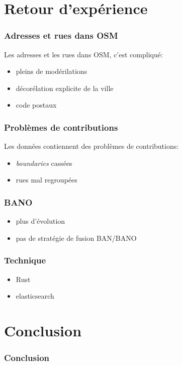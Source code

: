 \documentclass[table]{beamer}
\newcommand*{\foreign}[2][english]{%
    \emph{\foreignlanguage{#1}{#2}}%
}
\begin{document}
\section{Retour d'expérience}

\begin{frame}
  \frametitle{Adresses et rues dans OSM}

  Les adresses et les rues dans OSM, c'est compliqué:
  \begin{itemize}
  \item pleins de modérilations
  \item décorélation explicite de la ville
  \item code postaux
  \end{itemize}
\end{frame}

\begin{frame}
  \frametitle{Problèmes de contributions}

  Les données contiennent des problèmes de contributions:
  \begin{itemize}
  \item \foreign{boundaries} cassées
  \item rues mal regroupées
  \end{itemize}
\end{frame}

\begin{frame}
  \frametitle{BANO}

  \begin{itemize}
  \item plus d'évolution
  \item pas de stratégie de fusion BAN/BANO
  \end{itemize}
\end{frame}

\begin{frame}
  \frametitle{Technique}

  \begin{itemize}
  \item Rust
  \item elasticsearch
  \end{itemize}
\end{frame}

\section{Conclusion}

\begin{frame}
  \frametitle{Conclusion}

\end{frame}

\begin{frame}
  \titlepage
\end{frame}
\end{document}
